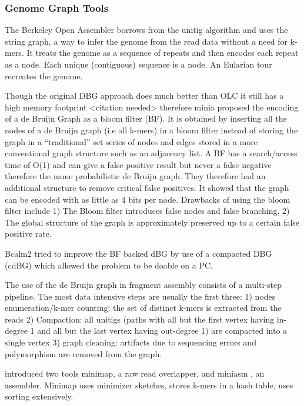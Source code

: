 \documentclass[a4paper]{article}
\begin{document}
\subsubsection{Genome Graph Tools}
\label{sec:org6240467}
The Berkeley Open Assembler \cite{myersFragmentAssemblyString2005} borrows 
from the unitig algorithm and uses the string graph, a way to infer the genome
from the read data without a need for k-mers.
It treats the genome as a sequence of repeats and then encodes each repeat as 
a node. Each unique (contiguous) sequence is a node. An Eularian tour recreates
the genome.

Though the original DBG approach does much better than OLC it still has a high 
memory footprint <citation needed> therefore minia
\cite{chikhiSpaceefficientExactBruijn2013} proposed the encoding of a 
de Bruijn Graph as a bloom filter (BF). It is obtained by inserting all the
nodes of a de Bruijn graph (i.e all k-mers) in a bloom filter instead of storing 
the graph in a “traditional” set series of nodes and edges stored in a more
conventional graph structure such as an adjacency list. 
A BF has a search/access time of O(1) and can give a false positive result but
never a false negative therefore the name probabilistic de Bruijn graph.  
They therefore had an additional structure to remove critical false positives.
It showed that the graph can be encoded with as little as 4 bits per node.
Drawbacks of using the bloom filter include 1) The Bloom filter introduces false
nodes and false branching, 2) The global structure of the graph is approximately
preserved up to a certain false positive rate.

Bcalm2 \cite{chikhiCompactingBruijnGraphs2016} tried to improve the BF backed dBG 
by use of a compacted DBG (cdBG) which allowed the problem to be doable on a PC.


The use of the de Bruijn graph in fragment assembly consists of a multi-step 
pipeline.
The most data intensive steps are usually the first three: 1) nodes
enumeration/k-mer counting: the set of distinct k-mers is extracted from the 
reads 2) Compaction: all unitigs (paths with all but the first vertex having 
in-degree 1 and all but the last vertex having out-degree 1) are compacted into
a single vertex 3) graph cleaning: artifacts due to sequencing errors and
polymorphism are removed from the graph.

\cite{liMinimapMiniasmFast2016} introduced two tools minimap, a raw read 
overlapper, and miniasm \cite{liMinimapMiniasmFast2016}, an assembler. 
Minimap uses minimizer sketches, stores k-mers in a hash table, uses sorting 
extensively.
\end{document}
